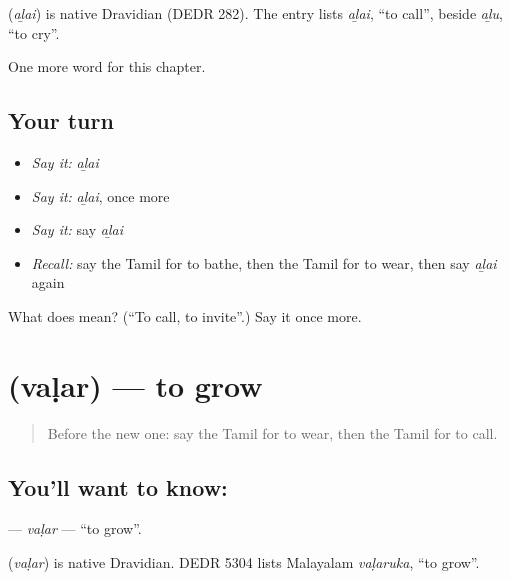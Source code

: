 \begin{cousinweb}
\textbf{} (\emph{aḻai}) is native Dravidian (DEDR 282). The entry lists \emph{aḻai}, \textquotedblleft{}to call\textquotedblright{}, beside \emph{aḻu}, \textquotedblleft{}to cry\textquotedblright{}.
\end{cousinweb}

\begin{grammarlens}[title={What you've built}]
One more word for this chapter.
\end{grammarlens}

\subsection*{Your turn}
\begin{itemize}
\raggedright
  \item \emph{Say it:} \emph{aḻai}
  \item \emph{Say it:} \emph{aḻai}, once more
  \item \emph{Say it:} say \emph{aḻai}
  \item \emph{Recall:} say the Tamil for to bathe, then the Tamil for to wear, then say \emph{aḻai} again
\end{itemize}

\begin{tcolorbox}[breakable,colback=teal!4,colframe=teal!35!black,title={Before you move on}]
What does  mean? (\textquotedblleft{}To call, to invite\textquotedblright{}.) Say it once more.
\end{tcolorbox}
\section[\texorpdfstring{\ta{வளர்} (vaḷar)}{வளர் (vaḷar)}]{ (vaḷar) — to grow}

\label{lesson:TA-C154-valar}



\begin{quote}
Before the new one: say the Tamil for to wear, then the Tamil for to call.
\end{quote}

\subsection*{You'll want to know: }
\textbf{} — \emph{vaḷar} — \textquotedblleft{}to grow\textquotedblright{}.

\begin{cousinweb}
\textbf{} (\emph{vaḷar}) is native Dravidian. DEDR 5304 lists Malayalam \emph{vaḷaruka}, \textquotedblleft{}to grow\textquotedblright{}.
\end{cousinweb}

